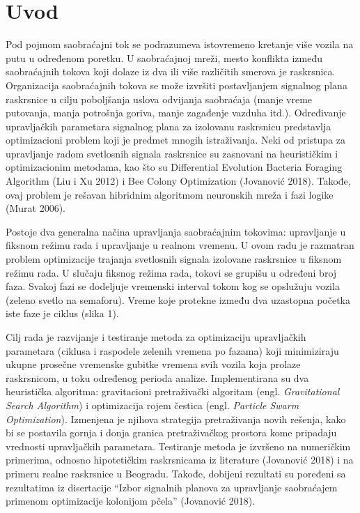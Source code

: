 \section{Uvod}

Pod pojmom saobraćajni tok se podrazumeva istovremeno kretanje više vozila na putu u određenom poretku. U saobraćajnoj mreži, mesto konflikta između saobraćajnih tokova koji dolaze iz dva ili više različitih smerova je raskrsnica. Organizacija saobraćajnih tokova se može izvršiti postavljanjem signalnog plana raskrsnice u cilju poboljšanja uslova odvijanja saobraćaja (manje vreme putovanja, manja potrošnja goriva, manje zagađenje vazduha itd.). Određivanje upravljačkih parametara signalnog plana za izolovanu raskrsnicu predstavlja optimizacioni problem koji je predmet mnogih istraživanja. Neki od pristupa za upravljanje radom svetlosnih signala raskrsnice su zasnovani na heurističkim i optimizacionim metodama, kao što su Differential Evolution Bacteria Foraging Algorithm (Liu i Xu 2012) i Bee Colony Optimization (Jovanović 2018). Takođe, ovaj problem je rešavan hibridnim algoritmom neuronskih mreža i fazi logike (Murat 2006).

\AuthorExHere

Postoje dva generalna načina upravljanja saobraćajnim tokovima: upravljanje u fiksnom režimu rada i upravljanje u realnom vremenu. U ovom radu je razmatran problem optimizacije trajanja svetlosnih signala izolovane raskrsnice u fiksnom režimu rada. U slučaju fiksnog režima rada, tokovi se grupišu u određeni broj faza. Svakoj fazi se dodeljuje vremenski interval tokom kog se opslužuju vozila (zeleno svetlo na semaforu). Vreme koje protekne između dva uzastopna početka iste faze je ciklus (slika 1).


Cilj rada je razvijanje i testiranje metoda za optimizaciju upravljačkih parametara (ciklusa i raspodele zelenih vremena po fazama) koji minimiziraju ukupne prosečne vremenske gubitke vremena svih vozila koja prolaze raskrsnicom, u toku određenog perioda analize. Implementirana su dva heuristička algoritma: gravitacioni pretraživački algoritam (engl. \emph{Gravitational Search Algorithm}) i optimizacija rojem čestica (engl. \emph{Particle Swarm Optimization}). Izmenjena je njihova strategija pretraživanja novih rešenja, kako bi se postavila gornja i donja granica pretraživačkog prostora kome pripadaju vrednosti upravljačkih parametara. Testiranje metoda je izvršeno na numeričkim primerima, odnosno hipotetičkim raskrsnicama iz literature (Jovanović 2018) i na primeru realne raskrsnice u Beogradu. Takođe, dobijeni rezultati su poređeni sa rezultatima iz disertacije “Izbor signalnih planova za upravljanje saobraćajem primenom optimizacije kolonijom pčela” (Jovanović 2018).

